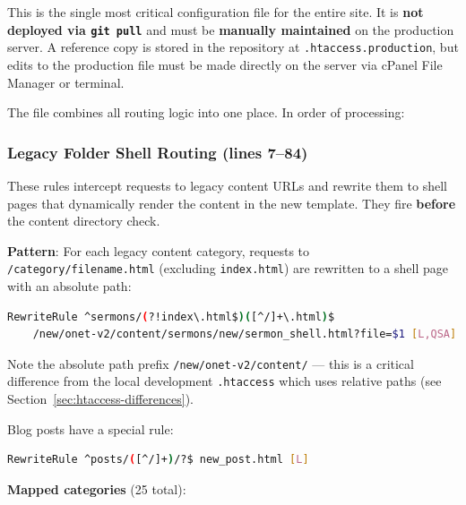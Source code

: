 \documentclass[12pt]{article}
\begin{document}
This is the single most critical configuration file for the entire site. It is \textbf{not deployed via \texttt{git pull}} and must be \textbf{manually maintained} on the production server. A reference copy is stored in the repository at \texttt{.htaccess.production}, but edits to the production file must be made directly on the server via cPanel File Manager or terminal.

The file combines all routing logic into one place. In order of processing:

\subsubsection{Legacy Folder Shell Routing (lines 7--84)}

These rules intercept requests to legacy content URLs and rewrite them to shell pages that dynamically render the content in the new template. They fire \textbf{before} the content directory check.

\textbf{Pattern}: For each legacy content category, requests to \texttt{/category/filename.html} (excluding \texttt{index.html}) are rewritten to a shell page with an absolute path:

\begin{lstlisting}[language=bash,numbers=none]
RewriteRule ^sermons/(?!index\.html$)([^/]+\.html)$
    /new/onet-v2/content/sermons/new/sermon_shell.html?file=$1 [L,QSA]
\end{lstlisting}

Note the absolute path prefix \texttt{/new/onet-v2/content/} --- this is a critical difference from the local development \texttt{.htaccess} which uses relative paths (see Section~\ref{sec:htaccess-differences}).

Blog posts have a special rule:
\begin{lstlisting}[language=bash,numbers=none]
RewriteRule ^posts/([^/]+)/?$ new_post.html [L]
\end{lstlisting}

\textbf{Mapped categories} (25 total):
\end{document}
